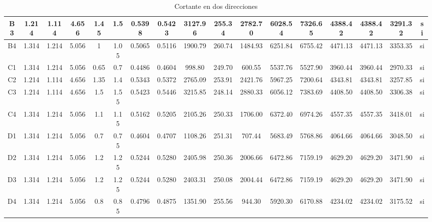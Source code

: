 \begin{table}[H]
{\begin{tabular}{|c|c|c|c|c|c|c|c|c|c|c|c|c|c|c|c|c|}
\hline
B3  & 1.214 & 1.114 & 4.656 & 1.45 & 1.5 & 0.5398 & 0.5423 & 3127.96 & 255.34 & 2782.70 & 6028.54 & 7326.65 & 4388.42 & 4388.42 & 3291.32 & si \bigstrut\\
\hline
B4  & 1.314 & 1.214 & 5.056 & 1   & 1.05 & 0.5065 & 0.5116 & 1900.79 & 260.74 & 1484.93 & 6251.84 & 6755.42 & 4471.13 & 4471.13 & 3353.35 & si \bigstrut\\
\hline
C1  & 1.314 & 1.214 & 5.056 & 0.65 & 0.7 & 0.4486 & 0.4604 & 998.80 & 249.70 & 600.55 & 5537.76 & 5527.90 & 3960.44 & 3960.44 & 2970.33 & si \bigstrut\\
\hline
C2  & 1.214 & 1.114 & 4.656 & 1.35 & 1.4 & 0.5343 & 0.5372 & 2765.09 & 253.91 & 2421.76 & 5967.25 & 7200.64 & 4343.81 & 4343.81 & 3257.85 & si \bigstrut\\
\hline
C3  & 1.214 & 1.114 & 4.656 & 1.5 & 1.55 & 0.5423 & 0.5446 & 3215.85 & 248.14 & 2880.33 & 6056.12 & 7383.69 & 4408.50 & 4408.50 & 3306.38 & si \bigstrut\\
\hline
C4  & 1.314 & 1.214 & 5.056 & 1.1 & 1.15 & 0.5162 & 0.5205 & 2105.26 & 250.33 & 1706.00 & 6372.40 & 6974.26 & 4557.35 & 4557.35 & 3418.01 & si \bigstrut\\
\hline
D1  & 1.314 & 1.214 & 5.056 & 0.7 & 0.75 & 0.4604 & 0.4707 & 1108.26 & 251.31 & 707.44 & 5683.49 & 5768.86 & 4064.66 & 4064.66 & 3048.50 & si \bigstrut\\
\hline
D2  & 1.314 & 1.214 & 5.056 & 1.2 & 1.25 & 0.5244 & 0.5280 & 2405.98 & 250.36 & 2006.66 & 6472.86 & 7159.19 & 4629.20 & 4629.20 & 3471.90 & si \bigstrut\\
\hline
D3  & 1.314 & 1.214 & 5.056 & 1.2 & 1.25 & 0.5244 & 0.5280 & 2403.31 & 250.08 & 2004.44 & 6472.86 & 7159.19 & 4629.20 & 4629.20 & 3471.90 & si \bigstrut\\
\hline
D4  & 1.314 & 1.214 & 5.056 & 0.8 & 0.85 & 0.4796 & 0.4875 & 1351.90 & 255.56 & 944.30 & 5920.30 & 6170.88 & 4234.02 & 4234.02 & 3175.52 & si \bigstrut\\
\hline
\end{tabular}}%

    \caption{Cortante en dos direcciones}
    \label{tab:cort2d}
\end{table}
